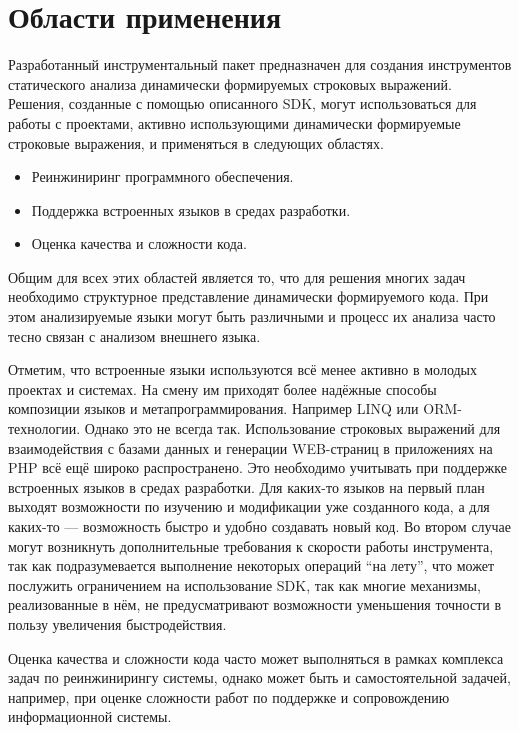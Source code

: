 \section{Области применения}

Разработанный инструментальный пакет предназначен для создания инструментов статического анализа динамически формируемых строковых выражений. Решения, созданные с помощью описанного SDK, могут использоваться для работы с проектами, активно использующими динамически формируемые строковые выражения, и применяться в следующих областях.

\begin{itemize}
    \item Реинжиниринг программного обеспечения.
    \item Поддержка встроенных языков в средах разработки.
    \item Оценка качества и сложности кода.
\end{itemize}

Общим для всех этих областей является то, что для решения многих задач необходимо структурное представление динамически формируемого кода. При этом анализируемые языки могут быть различными и процесс их анализа часто тесно связан с анализом внешнего языка.

Отметим, что встроенные языки используются всё менее активно в молодых проектах и системах. На смену им приходят более надёжные способы композиции языков и метапрограммирования. Например LINQ или ORM-технологии. Однако это не всегда так. Использование строковых выражений для взаимодействия с базами данных и генерации WEB-страниц в приложениях на PHP всё ещё широко распространено. Это необходимо учитывать при поддержке встроенных языков в средах разработки. Для каких-то языков на первый план выходят возможности по изучению и модификации уже созданного кода, а для каких-то --- возможность быстро и удобно создавать новый код. Во втором случае могут возникнуть дополнительные требования к скорости работы инструмента, так как подразумевается выполнение некоторых операций ``на лету'', что может послужить ограничением на использование SDK, так как многие механизмы, реализованные в нём, не предусматривают возможности уменьшения точности в пользу увеличения быстродействия.

Оценка качества и сложности  кода часто может выполняться в рамках комплекса задач по реинжинирингу системы, однако может быть и самостоятельной задачей, например, при оценке сложности работ по поддержке и сопровождению информационной системы.


